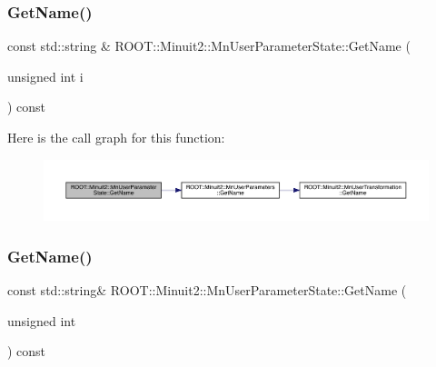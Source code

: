 \mbox{\label{classROOT_1_1Minuit2_1_1MnUserParameterState_a491c35a111b242ee53a8c150b53da67b}} 
\subsubsection{\texorpdfstring{GetName()}{GetName()}\hspace{0.1cm}{\footnotesize\ttfamily [2/3]}}
{\footnotesize\ttfamily const std\+::string \& R\+O\+O\+T\+::\+Minuit2\+::\+Mn\+User\+Parameter\+State\+::\+Get\+Name (\begin{DoxyParamCaption}\item[{unsigned int}]{i }\end{DoxyParamCaption}) const}

Here is the call graph for this function\+:
\nopagebreak
\begin{figure}[H]
\begin{center}
\leavevmode
\includegraphics[width=350pt]{d3/de0/classROOT_1_1Minuit2_1_1MnUserParameterState_a491c35a111b242ee53a8c150b53da67b_cgraph}
\end{center}
\end{figure}
\mbox{\label{classROOT_1_1Minuit2_1_1MnUserParameterState_a6740898dda45c1f6f485a0a82ce63618}} 
\subsubsection{\texorpdfstring{GetName()}{GetName()}\hspace{0.1cm}{\footnotesize\ttfamily [3/3]}}
{\footnotesize\ttfamily const std\+::string\& R\+O\+O\+T\+::\+Minuit2\+::\+Mn\+User\+Parameter\+State\+::\+Get\+Name (\begin{DoxyParamCaption}\item[{unsigned int}]{ }\end{DoxyParamCaption}) const}

